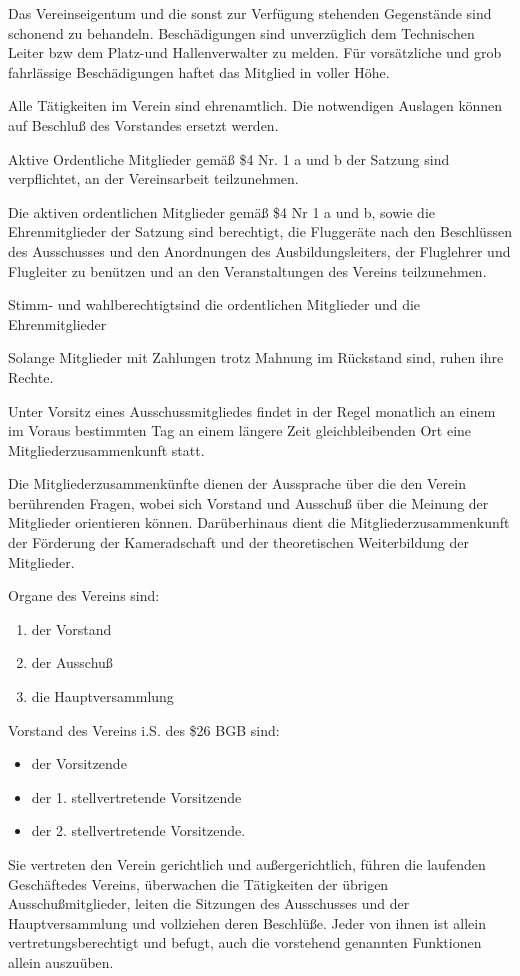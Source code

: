 \documentclass[11pt,a4paper,parskip=half]{scrartcl}
\begin{document}
\begin{contract}
\begin{multicols}{2}
		Das Vereinseigentum und die sonst zur Verfügung stehenden Gegenstände sind schonend zu behandeln.
		Beschädigungen sind unverzüglich dem Technischen Leiter bzw dem Platz-und Hallenverwalter zu melden.
		Für vorsätzliche und grob fahrlässige Beschädigungen haftet das Mitglied in voller Höhe.

		Alle Tätigkeiten im Verein sind ehrenamtlich.
		Die notwendigen Auslagen können auf Beschluß des Vorstandes ersetzt werden.

		Aktive Ordentliche Mitglieder gemäß \$4 Nr. 1 a und b der Satzung sind verpflichtet,
    an der Vereinsarbeit teilzunehmen.


		Die aktiven ordentlichen Mitglieder gemäß \$4 Nr 1 a und b,
    sowie die Ehrenmitglieder der Satzung sind berechtigt,
    die Fluggeräte nach den Beschlüssen des Ausschusses und den Anordnungen des Ausbildungsleiters,
    der Fluglehrer und Flugleiter zu benützen und an den Veranstaltungen des Vereins teilzunehmen.

		Stimm- und wahlberechtigtsind die ordentlichen Mitglieder und die Ehrenmitglieder

		Solange Mitglieder mit Zahlungen trotz Mahnung im Rückstand sind,
    ruhen ihre Rechte.

		Unter Vorsitz eines Ausschussmitgliedes findet in	der Regel monatlich an einem im Voraus bestimmten Tag an einem längere Zeit gleichbleibenden Ort eine Mitgliederzusammenkunft statt.

		Die Mitgliederzusammenkünfte dienen der	Aussprache über die den Verein berührenden Fragen,
    wobei sich Vorstand und Ausschuß über die Meinung der Mitglieder orientieren können.
    Darüberhinaus dient die Mitgliederzusammenkunft der Förderung der Kameradschaft und der theoretischen Weiterbildung der Mitglieder.

		Organe des Vereins sind:
    \begin{enumerate}
		\item der Vorstand
		\item der Ausschuß
		\item die Hauptversammlung
    \end{enumerate}

		Vorstand des Vereins i.S. des \$26 BGB sind:
    \begin{itemize}
      \item der Vorsitzende
      \item der 1. stellvertretende Vorsitzende
      \item der 2. stellvertretende Vorsitzende.
    \end{itemize}
		Sie vertreten den Verein gerichtlich und außergerichtlich,
    führen die laufenden Geschäftedes Vereins,
    überwachen die Tätigkeiten der übrigen Ausschußmitglieder,
    leiten die Sitzungen des Ausschusses und der Hauptversammlung und vollziehen deren Beschlüße.
    Jeder von ihnen ist allein vertretungsberechtigt und befugt,
    auch die vorstehend genannten Funktionen allein auszuüben.


\end{multicols}
\end{contract}
\end{document}
